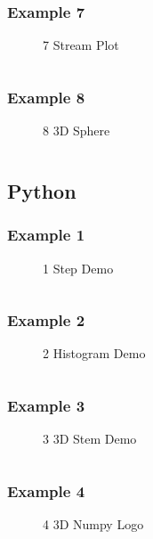 \subsubsection{Example 7}
\begin{figure}[!htb]
    \centering
    
    \caption{7 Stream Plot}
    \label{fig:7-stream-plot}
\end{figure}
\inputminted{mathematica}{./gallery/example_7.wls}
\newpage

\subsubsection{Example 8}
\begin{figure}[!htb]
    \centering
    
    \caption{8 3D Sphere}
    \label{fig:8-3d-sphere}
\end{figure}
\inputminted{mathematica}{./gallery/example_8.wls}
\newpage


\subsection{Python}
\subsubsection{Example 1}
\begin{figure}[!htb]
    \centering
    
    \caption{1 Step Demo}
    \label{fig:1-step-demo}
\end{figure}
\inputminted{python}{./gallery/example_1.mpl}
\newpage


\subsubsection{Example 2}
\begin{figure}[!htb]
    \centering
    
    \caption{2 Histogram Demo}
    \label{fig:2-histogram-demo}
\end{figure}
\inputminted{python}{./gallery/example_2.mpl}
\newpage


\subsubsection{Example 3}
\begin{figure}[!htb]
    \centering
    
    \caption{3 3D Stem Demo}
    \label{fig:3-3d-stem-demo}
\end{figure}
\inputminted{python}{./gallery/example_3.mpl}
\newpage

\subsubsection{Example 4}
\begin{figure}[!htb]
    \centering
    
    \caption{4 3D Numpy Logo}
    \label{fig:4-numpy-logo}
\end{figure}
\inputminted{python}{./gallery/example_4.mpl}
\newpage

